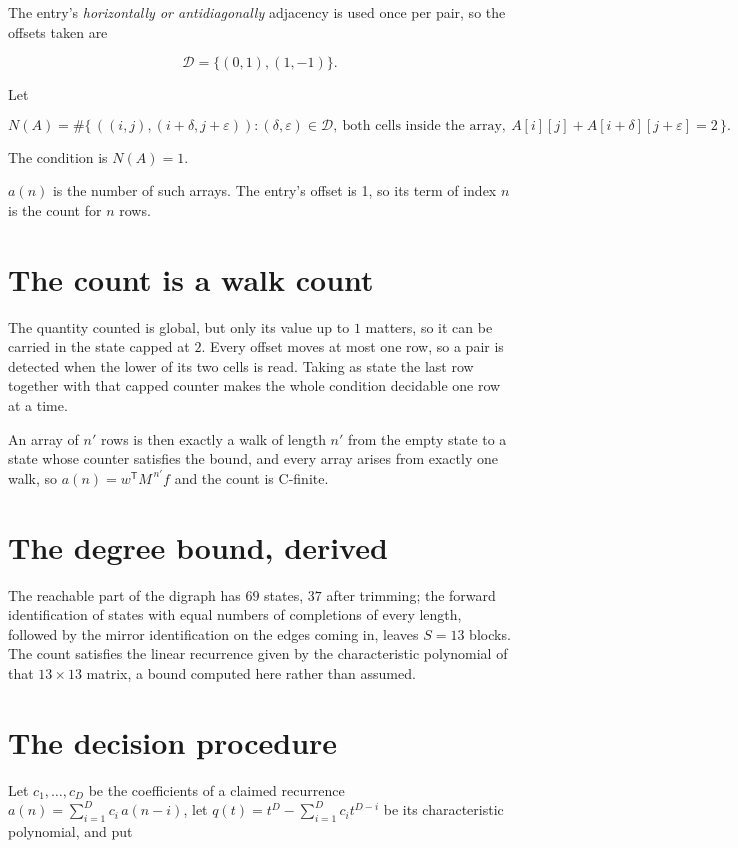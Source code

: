 \documentclass[11pt]{article}
\theoremstyle{definition}
\begin{document}
The entry's {\itshape horizontally or antidiagonally} adjacency is used once per pair, so the offsets taken are

\[\mathcal{D} = \{(0,1), (1,-1)\}.\]

Let

\[N(A) = \#\bigl\{\,((i,j),(i{+}\delta,j{+}\varepsilon)) : (\delta,\varepsilon) \in \mathcal{D},\ \text{both cells inside the array},\ A[i][j] + A[i{+}\delta][j{+}\varepsilon] = 2\,\bigr\}.\]

The condition is $N(A) = 1$.

$a(n)$ is the number of such arrays. The entry's offset is 1, so its term of index $n$ is the count for $n$ rows.

\section{The count is a walk count}

The quantity counted is global, but only its value up to $1$ matters, so it can be carried in the state capped at $2$. Every offset moves at most one row, so a pair is detected when the lower of its two cells is read. Taking as state the last row together with that capped counter makes the whole condition decidable one row at a time.

An array of $n'$ rows is then exactly a walk of length $n'$ from the empty state to a state whose counter satisfies the bound, and every array arises from exactly one walk, so $a(n) = w^{\mathsf T}M^{\,n'}f$ and the count is C-finite.

\section{The degree bound, derived}

The reachable part of the digraph has $69$ states, $37$ after trimming; the forward identification of states with equal numbers of completions of every length, followed by the mirror identification on the edges coming in, leaves $S = 13$ blocks. The count satisfies the linear recurrence given by the characteristic polynomial of that $13\times13$ matrix, a bound computed here rather than assumed.

\section{The decision procedure}

Let $c_1,\dots,c_D$ be the coefficients of a claimed recurrence $a(n) = \sum_{i=1}^{D} c_i\,a(n-i)$, let $q(t) = t^{D} - \sum_{i=1}^{D} c_i t^{D-i}$ be its characteristic polynomial, and put
\end{document}
